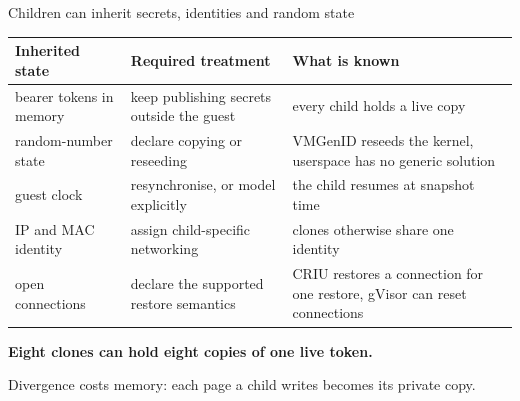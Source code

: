 \begin{frame}[t]{\ev{\tagO}Children can inherit secrets, identities and random state}
\vspace{0pt}
{\footnotesize\renewcommand{\arraystretch}{1.1}
\begin{tabularx}{\textwidth}{@{}L{3.3cm}L{5.2cm}Y@{}}
\toprule
Inherited state & Required treatment & What is known\\
\midrule
bearer tokens in memory & keep publishing secrets outside the guest & every child holds a live copy\\
random-number state & declare copying or reseeding & VMGenID reseeds the kernel, userspace has no generic solution\\
guest clock & resynchronise, or model explicitly & the child resumes at snapshot time\\
IP and MAC identity & assign child-specific networking & clones otherwise share one identity\\
open connections & declare the supported restore semantics & CRIU restores a connection for one restore, gVisor can reset connections\\
\bottomrule
\end{tabularx}\par}
\vspace{.15cm}
{\normalsize\bfseries Eight clones can hold eight copies of one live token.\par}
\vspace{.05cm}
{\small Divergence costs memory: each page a child writes becomes its private copy.\par}
\end{frame}
